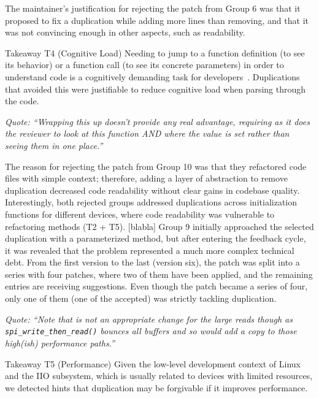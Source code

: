 \documentclass[10pt,conference]{IEEEtran}
\newenvironment{highlight-box}[1]{%
  \begin{tcolorbox}
  \textbf{#1:} \itshape}{\end{tcolorbox}}
\begin{document}
The maintainer's justification for rejecting the patch from Group 6 was that it proposed to fix a duplication while adding more lines than removing, and that it was not convincing enough in other aspects, such as readability.

\begin{highlight-box}{Takeaway T4 (Cognitive Load)}
  Needing to jump to a function definition (to see its behavior) or a function
  call (to see its concrete parameters) in order to understand code is a
  cognitively demanding task for developers~\cite{questions-programmers-ask}.
  Duplications that avoided this were justifiable to reduce cognitive load when
  parsing through the code.
\hfill\\

\noindent
\begin{footnotesize}
\textit{
  Quote: ``Wrapping this up doesn't provide any real advantage, requiring as
  it does the reviewer to look at this function AND where the value is set
  rather than seeing them in one place.''
}
\end{footnotesize}
\end{highlight-box}

The reason for rejecting the patch from Group 10 was that they refactored code files with simple context; therefore, adding a layer of abstraction to remove duplication decreased code readability without clear gains in codebase quality. Interestingly, both rejected groups addressed duplications across initialization functions for different devices, where code readability was vulnerable to refactoring methods (T2  + T5). [blabla] Group 9 initially approached the selected duplication with a parameterized method, but after entering the feedback cycle, it was revealed that the problem represented a much more complex technical debt. From the first version to the last (version six), the patch was split into a series with four patches, where two of them have been applied, and the remaining entries are receiving suggestions. Even though the patch became a series of four, only one of them (one of the accepted) was strictly tackling duplication.

\noindent
\begin{footnotesize}
\textit{
  Quote: ``Note that is not an appropriate change for the large reads though
  as \texttt{spi\_write\_then\_read()} bounces all buffers and so would add a
  copy to those high(ish) performance paths.''
}
\end{footnotesize}

\begin{highlight-box}{Takeaway T5 (Performance)}
  Given the low-level development context of Linux and the IIO subsystem, which
  is usually related to devices with limited resources, we detected hints that
  duplication may be forgivable if it improves performance.
\hfill\\
\end{highlight-box}
\end{document}
